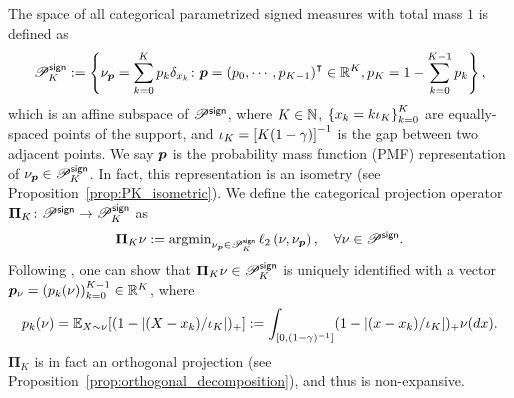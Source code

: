 The space of all categorical parametrized signed measures with total mass $1$ is defined as
\begin{equation*}
    {\mathscr{P}}^{\mathsf{sign}}_K := \left\{ \nu_{\bm{p}}=\sum_{k=0}^K p_k \delta_{x_k} \colon  {\bm{p}}=\left({p_0,\cdots,p_{K-1}}\right)^{\intercal}\in {\mathbb R}^K, p_K=1-\sum_{k=0}^{K-1}p_k \right\}, 
\end{equation*}
which is an affine subspace of ${\mathscr{P}}^{\mathsf{sign}}$, where $K\in {\mathbb N}$, $\left\{{x_k=k\iota_K}\right\}_{k=0}^K$ are equally-spaced points of the support, and $\iota_K=\left[{K(1-\gamma)}\right]^{-1}$ is the gap between two adjacent points.
We say ${\bm{p}}$ is the probability mass function (PMF) representation of $\nu_{\bm{p}}\in{\mathscr{P}}^{\mathsf{sign}}_K$.
In fact, this representation is an isometry (see Proposition~\ref{prop:PK_isometric}).
We define the categorical projection operator ${\bm{\Pi}}_{K}\colon {\mathscr{P}}^{\mathsf{sign}}\to{\mathscr{P}}^{\mathsf{sign}}_K$ as
\begin{equation*}
   {\bm{\Pi}}_{K}\nu:=\operatorname*{argmin}\nolimits_{\nu_{\bm{p}}\in{\mathscr{P}}^{\mathsf{sign}}_{K}}\ell_{2}\left({\nu, \nu_{\bm{p}}}\right),\quad \forall\nu\in {\mathscr{P}}^{\mathsf{sign}}. 
\end{equation*}
Following \citep[Proposition~5.14][]{bdr2022}, one can show that $\bm{\Pi}_K\nu\in{\mathscr{P}}^{\mathsf{sign}}_K$ is uniquely identified with a vector ${\bm{p}}_\nu=\left({p_k(\nu)}\right)_{k=0}^{K-1}\in{\mathbb R}^K$, where
\begin{equation}\label{eq:categorical_prob}
     p_k(\nu)={\mathbb E}_{X\sim \nu}[(1-\left|{(X-x_k)/{\iota_K}}\right|)_+]:=\int_{\left[{0,(1-\gamma)^{-1}}\right]}(1-\left|{(x-x_k)/{\iota_K}}\right|)_+ \nu(dx).
\end{equation}
$\bm{\Pi}_K$ is in fact an orthogonal projection (see Proposition~\ref{prop:orthogonal_decomposition}), and thus is non-expansive.

